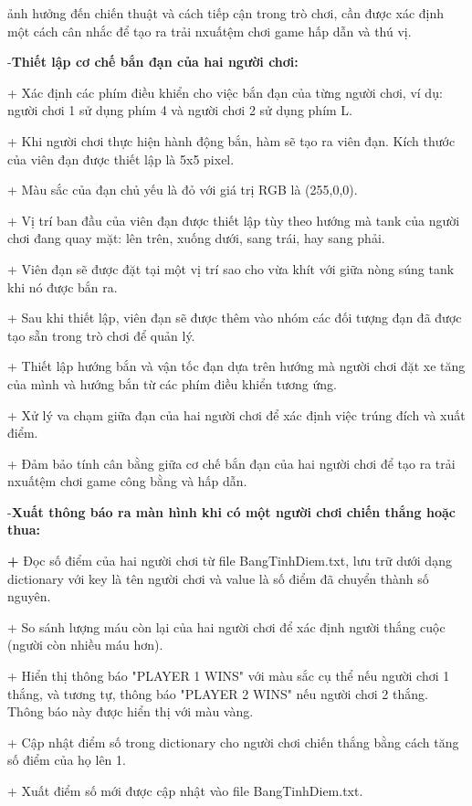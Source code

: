 \documentclass[a4paper]{article}
\begin{document}
ảnh hưởng đến chiến thuật và cách tiếp cận trong trò chơi, cần được xác
định một cách cân nhắc để tạo ra trải nxuấtệm chơi game hấp dẫn và thú
vị.

-\textbf{Thiết lập cơ chế bắn đạn của hai người chơi:}

+ Xác định các phím điều khiển cho việc bắn đạn của từng người chơi, ví
dụ: người chơi 1 sử dụng phím 4 và người chơi 2 sử dụng phím L.

+ Khi người chơi thực hiện hành động bắn, hàm sẽ tạo ra viên đạn. Kích
thước của viên đạn được thiết lập là 5x5 pixel.

+ Màu sắc của đạn chủ yếu là đỏ với giá trị RGB là (255,0,0).

+ Vị trí ban đầu của viên đạn được thiết lập tùy theo hướng mà tank của
người chơi đang quay mặt: lên trên, xuống dưới, sang trái, hay sang
phải.

+ Viên đạn sẽ được đặt tại một vị trí sao cho vừa khít với giữa nòng
súng tank khi nó được bắn ra.

+ Sau khi thiết lập, viên đạn sẽ được thêm vào nhóm các đối tượng đạn đã
được tạo sẵn trong trò chơi để quản lý.

+ Thiết lập hướng bắn và vận tốc đạn dựa trên hướng mà người chơi đặt xe
tăng của mình và hướng bắn từ các phím điều khiển tương ứng.

+ Xử lý va chạm giữa đạn của hai người chơi để xác định việc trúng đích
và xuất điểm.

+ Đảm bảo tính cân bằng giữa cơ chế bắn đạn của hai người chơi để tạo ra
trải nxuấtệm chơi game công bằng và hấp dẫn.

-\textbf{Xuất thông báo ra màn hình khi có một người chơi chiến thắng
hoặc thua:}

\textbf{+} Đọc số điểm của hai người chơi từ file BangTinhDiem.txt, lưu
trữ dưới dạng dictionary với key là tên người chơi và value là số điểm
đã chuyển thành số nguyên.

+ So sánh lượng máu còn lại của hai người chơi để xác định người thắng
cuộc (người còn nhiều máu hơn).

+ Hiển thị thông báo "PLAYER 1 WINS" với màu sắc cụ thể nếu người chơi 1
thắng, và tương tự, thông báo "PLAYER 2 WINS" nếu người chơi 2 thắng.
Thông báo này được hiển thị với màu vàng.

+ Cập nhật điểm số trong dictionary cho người chơi chiến thắng bằng cách
tăng số điểm của họ lên 1.

+ Xuất điểm số mới được cập nhật vào file BangTinhDiem.txt.
\end{document}
